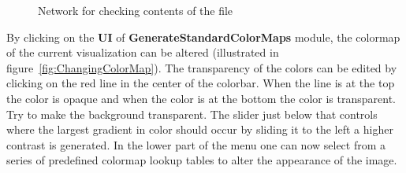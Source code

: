 \documentclass[fleqn,11pt,openany]{book}
\begin{document}
\begin{figure}
\caption{Network for checking contents of the file}\label{fig:FirstViewer}
\end{figure}

By clicking on the {\bf UI} of {\bf GenerateStandardColorMaps} module, the colormap of the current visualization can be altered (illustrated in figure~\ref{fig:ChangingColorMap}). The transparency of the colors can be edited by clicking on the red line in the center of the colorbar. When the line is at the top the color is opaque and when the color is at the bottom the color is transparent. Try to make the background transparent. The slider just below that controls where the largest gradient in color should occur by sliding it to the left a higher contrast is generated. In the lower part of the menu one can now select from a series of predefined colormap lookup tables to alter the appearance of the image.
\end{document}
